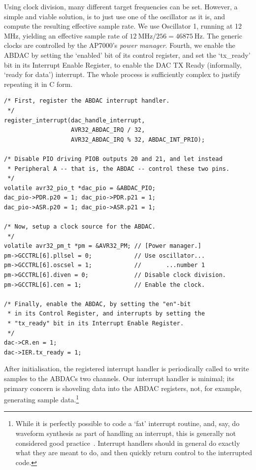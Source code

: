 \documentclass[a4paper,9pt]{article}
\begin{document}
Using clock division, many different target frequencies can be set. However,
a simple and viable solution, is to just use one of the oscillator as it is,
and compute the resulting effective sample rate. We use Oscillator 1, running
at 12 MHz, yielding an effective sample rate of $12~\text{MHz} / 256 =
46875~\text{Hz}$.  The generic clocks are controlled by the AP7000's
\emph{power manager}.  Fourth, we enable the ABDAC by setting the `enabled'
bit of its control register, and set the `tx\_ready' bit in its Interrupt
Enable Register, to enable the DAC TX Ready (informally, `ready for data')
interrupt.  The whole process is sufficiently complex to justify repeating it
in C form.

\begin{lstlisting}
/* First, register the ABDAC interrupt handler.
 */
register_interrupt(dac_handle_interrupt,
                   AVR32_ABDAC_IRQ / 32,
                   AVR32_ABDAC_IRQ % 32, ABDAC_INT_PRIO);

/* Disable PIO driving PIOB outputs 20 and 21, and let instead
 * Peripheral A -- that is, the ABDAC -- control these two pins.
 */
volatile avr32_pio_t *dac_pio = &ABDAC_PIO;
dac_pio->PDR.p20 = 1; dac_pio->PDR.p21 = 1;
dac_pio->ASR.p20 = 1; dac_pio->ASR.p21 = 1;

/* Now, setup a clock source for the ABDAC.
 */
volatile avr32_pm_t *pm = &AVR32_PM; // [Power manager.]
pm->GCCTRL[6].pllsel = 0;            // Use oscillator...
pm->GCCTRL[6].oscsel = 1;            //       ...number 1
pm->GCCTRL[6].diven = 0;             // Disable clock division.
pm->GCCTRL[6].cen = 1;               // Enable the clock.

/* Finally, enable the ABDAC, by setting the "en"-bit 
 * in its Control Register, and interrupts by setting the 
 * "tx_ready" bit in its Interrupt Enable Register.
 */
dac->CR.en = 1;
dac->IER.tx_ready = 1;
\end{lstlisting}
After initialisation, the registered interrupt handler is periodically called
to write samples to the ABDACs two channels. Our interrupt handler is
minimal; its primary concern is shoveling data into the ABDAC registers, not,
for example, generating sample data.\footnote{While it is perfectly possible
to code a `fat' interrupt routine, and, say, do waveform synthesis as part of
handling an interrupt, this is generally not considered good
practice~\cite[Section 5.2]{intc}. Interrupt handlers should in general do
exactly what they are meant to do, and then quickly return control to the
interrupted code.} 
\end{document}
